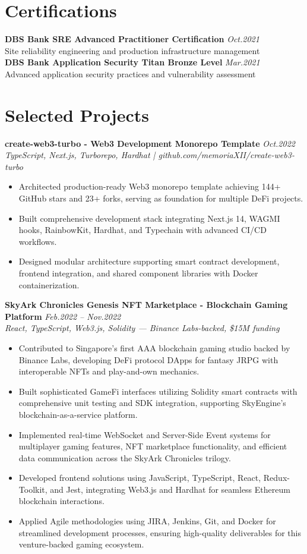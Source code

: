 \documentclass[11pt,a4paper]{article}
\newcommand{\resumeItem}[1]{\item\small{#1}}
\begin{document}
\vspace{10pt}

\section{Certifications}
\textbf{DBS Bank SRE Advanced Practitioner Certification} \hfill \textit{Oct.2021}\\
Site reliability engineering and production infrastructure management\\
\textbf{DBS Bank Application Security Titan Bronze Level} \hfill \textit{Mar.2021}\\
Advanced application security practices and vulnerability assessment\\

\vspace{0pt}

\section{Selected Projects}
\textbf{create-web3-turbo - Web3 Development Monorepo Template} \hfill \textit{Oct.2022}\\
\textit{TypeScript, Next.js, Turborepo, Hardhat | github.com/memoriaXII/create-web3-turbo}
\begin{itemize}[leftmargin=*, itemsep=1pt, parsep=0pt]
    \resumeItem{Architected production-ready Web3 monorepo template achieving 144+ GitHub stars and 23+ forks, serving as foundation for multiple DeFi projects.}
    \resumeItem{Built comprehensive development stack integrating Next.js 14, WAGMI hooks, RainbowKit, Hardhat, and Typechain with advanced CI/CD workflows.}
    \resumeItem{Designed modular architecture supporting smart contract development, frontend integration, and shared component libraries with Docker containerization.}
\end{itemize}
\textbf{SkyArk Chronicles Genesis NFT Marketplace - Blockchain Gaming Platform} \hfill \textit{Feb.2022 -- Nov.2022}\\
\textit{React, TypeScript, Web3.js, Solidity — Binance Labs-backed, \$15M funding}
\begin{itemize}[leftmargin=*, itemsep=1pt, parsep=0pt]
    \resumeItem{Contributed to Singapore's first AAA blockchain gaming studio backed by Binance Labs, developing DeFi protocol DApps for fantasy JRPG with interoperable NFTs and play-and-own mechanics.}
    \resumeItem{Built sophisticated GameFi interfaces utilizing Solidity smart contracts with comprehensive unit testing and SDK integration, supporting SkyEngine's blockchain-as-a-service platform.}
    \resumeItem{Implemented real-time WebSocket and Server-Side Event systems for multiplayer gaming features, NFT marketplace functionality, and efficient data communication across the SkyArk Chronicles trilogy.}
    \resumeItem{Developed frontend solutions using JavaScript, TypeScript, React, Redux-Toolkit, and Jest, integrating Web3.js and Hardhat for seamless Ethereum blockchain interactions.}
    \resumeItem{Applied Agile methodologies using JIRA, Jenkins, Git, and Docker for streamlined development processes, ensuring high-quality deliverables for this venture-backed gaming ecosystem.}
\end{itemize}
\end{document}
